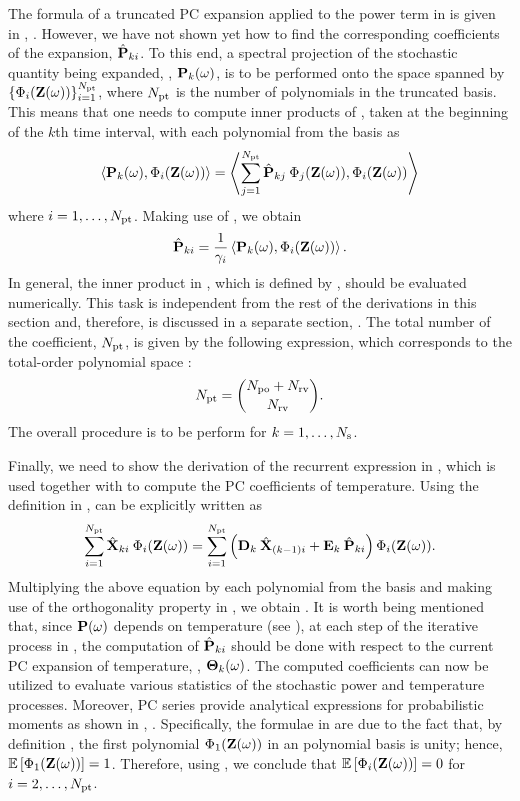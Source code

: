The formula of a truncated PC expansion applied to the power term in  is given in , . However, we have not shown yet how to find the corresponding coefficients of the expansion, $\hat{\mathbf{P}}_{ki}$. To this end, a spectral projection of the stochastic quantity being expanded, \ie, $\mathbf{P}_k(\omega)$, is to be performed onto the space spanned by $\{ \Phi_i(\mathbf{Z}(\omega)) \}_{i = 1}^{{N_\text{pt}}}$, where ${N_\text{pt}}$ is the number of polynomials in the truncated basis. This means that one needs to compute inner products of , taken at the beginning of the $k$th time interval, with each polynomial from the basis as
\[
  \oInner{\vP_k(\o)}{\pcb_i(\vZ(\o))} = \oInner{\sum_{j=1}^{\pcterms} \pcc{\vP}_{kj} \: \pcb_j(\vZ(\o))}{\pcb_i(\vZ(\o))}
\]
where $i = 1, \dotsc, {N_\text{pt}}$. Making use of , we obtain
\begin{equation} \elabel{pc-coefficients}
  \pcc{\vP}_{ki} = \frac{1}{\pcn_i} \oInner{\vP_k(\o)}{\pcb_i(\vZ(\o))}.
\end{equation}
In general, the inner product in , which is defined by , should be evaluated numerically. This task is independent from the rest of the derivations in this section and, therefore, is discussed in a separate section, . The total number of the coefficient, ${N_\text{pt}}$, is given by the following expression, which corresponds to the total-order polynomial space \cite{beck2011}:
\begin{equation} \elabel{pc-terms}
  \pcterms = { \pcorder + \vars \choose \vars }.
\end{equation}
The overall procedure is to be perform for $k = 1, \dotsc, N_\text{s}$.

Finally, we need to show the derivation of the recurrent expression in , which is used together with  to compute the PC coefficients of temperature. Using the definition in ,  can be explicitly written as
\[
  \sum_{i = 1}^{\pcterms} \pcc{\vX}_{ki} \: \pcb_i(\vZ(\o)) = \sum_{i = 1}^{\pcterms} \left( \mCF_k \: \pcc{\vX}_{(k - 1)i} + \mCS_k \: \pcc{\vP}_{ki} \right) \pcb_i(\vZ(\o)).
\]
Multiplying the above equation by each polynomial from the basis and making use of the orthogonality property in , we obtain . It is worth being mentioned that, since $\mathbf{P}(\omega)$ depends on temperature (see ), at each step of the iterative process in , the computation of $\hat{\mathbf{P}}_{ki}$ should be done with respect to the current PC expansion of temperature, \ie, ${\boldsymbol\Theta}_k(\omega)$. The computed coefficients can now be utilized to evaluate various statistics of the stochastic power and temperature processes. Moreover, PC series provide analytical expressions for probabilistic moments as shown in , . Specifically, the formulae in  are due to the fact that, by definition \cite{xiu2010}, the first polynomial $\Phi_1(\mathbf{Z}(\omega))$ in an polynomial basis is unity; hence, $\mathbb{E}\left[\Phi_1(\mathbf{Z}(\omega))\right] = 1$. Therefore, using , we conclude that $\mathbb{E}\left[\Phi_i(\mathbf{Z}(\omega))\right] = 0$ for $i = 2, \dotsc, {N_\text{pt}}$.

